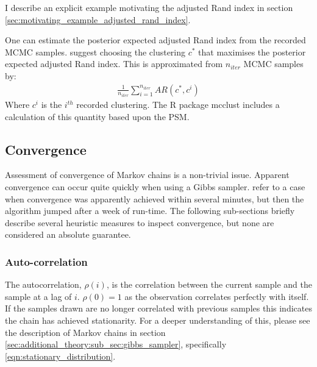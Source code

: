 \documentclass[14pt]{extarticle} %
\begin{document}
	I describe an explicit example motivating the adjusted Rand index in section \ref{sec:motivating_example_adjusted_rand_index}.
	
	One can estimate the posterior expected adjusted Rand index from the recorded MCMC samples. \citet{FritschImprovedcriteriaclustering2009} suggest choosing the clustering $c^*$ that maximises the posterior expected adjusted Rand index. This is approximated from $n_{iter}$ MCMC samples by:
	\begin{align} \label{eqn:PEAR}
	\frac{1}{n_{iter}}\sum_{i=1}^{n_{iter}} AR(c^*, c^i)
	\end{align}
	Where $c^i$ is the $i^{th}$ recorded clustering. The R package mcclust \citep{FritschMcclust2012} includes a calculation of this quantity based upon the PSM.
	
	\subsection{Convergence}
	Assessment of convergence of Markov chains is a non-trivial issue. Apparent convergence can occur quite quickly when using a Gibbs sampler. \citet{ripley1990iterative} refer to a case when convergence was apparently achieved within several minutes, but then the algorithm jumped after a week of run-time. The following sub-sections briefly describe several heuristic measures to inspect convergence, but none are considered an absolute guarantee.
	
	\subsubsection{Auto-correlation} \label{sec:additional_theory:sub_sec:convergence:sub_sub_sec:autocorrelation}
	The autocorrelation, $\rho(i)$, is the correlation between the current sample and the sample at a lag of $i$. $\rho(0)=1$ as the observation correlates perfectly with itself. If the samples drawn are no longer correlated with previous samples this indicates the chain has achieved stationarity. For a deeper understanding of this, please see the description of Markov chains in section \ref{sec:additional_theory:sub_sec:gibbs_sampler}, specifically \eqref{eqn:stationary_distribution}.
	
\end{document}
